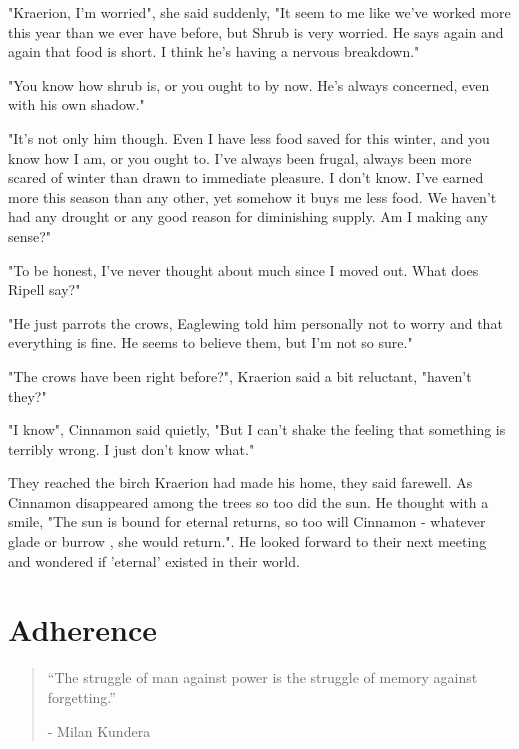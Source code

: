 \documentclass[smalldemyvopaper,11pt,twoside,onecolumn,openright,extrafontsizes]{memoir}
\begin{document}
"Kraerion, I'm worried", she said suddenly, "It seem to me like we've worked more this year than we ever have before, but Shrub is very worried. He says again and again that food is short. I think he's having a nervous breakdown."

"You know how shrub is, or you ought to by now. He's always concerned, even with his own shadow."

"It's not only him though. Even I have less food saved for this winter, and you know how I am, or you ought to. I've always been frugal, always been more scared of winter than drawn to immediate pleasure. I don't know. I've earned more this season than any other, yet somehow it buys me less food. We haven't had any drought or any good reason for diminishing supply. Am I making any sense?"

"To be honest, I've never thought about much since I moved out. What does Ripell say?"

"He just parrots the crows, Eaglewing told him personally not to worry and that everything is fine. He seems to believe them, but I'm not so sure."

"The crows have been right before?", Kraerion said a bit reluctant, "haven't they?"

"I know", Cinnamon said quietly, "But I can't shake the feeling that something is terribly wrong. I just don't know what."

They reached the birch Kraerion had made his home, they said farewell. As Cinnamon disappeared among the trees so too did the sun. He thought with a smile, "The sun is bound for eternal returns, so too will Cinnamon - whatever glade or burrow , she would return.". He looked forward to their next meeting and wondered if 'eternal' existed in their world.      

\chapter{Adherence}

\vspace{-1.3cm}
\begin{localsize}{10}
	\begin{quote}
		“The struggle of man against power is the struggle of memory against forgetting.”
		\begin{flushright}- Milan Kundera \end{flushright}
	\end{quote} 
\end{localsize}
\vspace{1cm}
\end{document}
